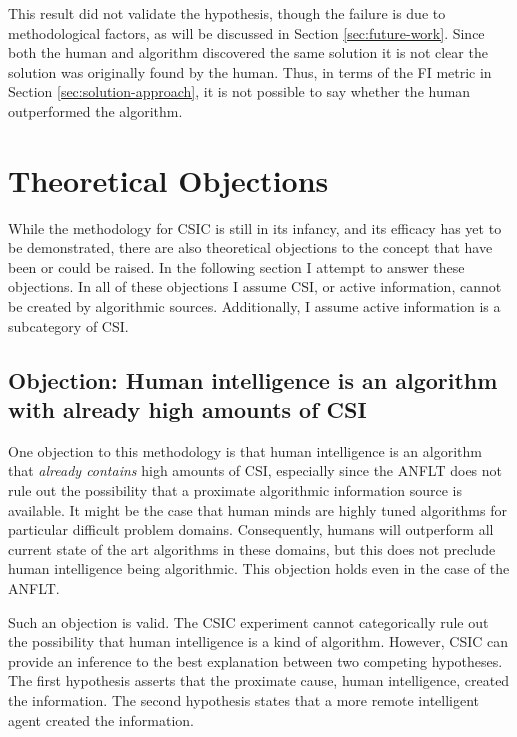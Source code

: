 This result did not validate the hypothesis, though the failure is  due to methodological factors, as will be discussed in Section \ref{sec:future-work}.  Since both the human and algorithm discovered the same solution it is not clear the solution was originally found by the human.  Thus, in terms of the FI metric in Section \ref{sec:solution-approach}, it is not possible to say whether the human outperformed the algorithm.

\section{Theoretical Objections}\label{sec:objections}

While the methodology for CSIC is still in its infancy, and its efficacy has yet to be demonstrated, there are also theoretical objections to the concept that have been or could be raised.  In the following section I attempt to answer these objections.  In all of these objections I assume CSI, or active information, cannot be created by algorithmic sources.  Additionally, I assume active information is a subcategory of CSI.

\subsection{Objection: Human intelligence is an algorithm with already high amounts of CSI}

One objection to this methodology is that human intelligence is an algorithm that \emph{already contains} high amounts of CSI, especially since the ANFLT does not rule out the possibility that a proximate algorithmic information source is available.  It might be the case that human minds are highly tuned algorithms for particular difficult problem domains.  Consequently, humans will outperform all current state of the art algorithms in these domains, but this does not preclude human intelligence being algorithmic.  This objection holds even in the case of the ANFLT.

Such an objection is valid.  The CSIC experiment cannot categorically rule out the possibility that human intelligence is a kind of algorithm.  However, CSIC can provide an inference to the best explanation between two competing hypotheses.  The first hypothesis asserts that the proximate cause, human intelligence, created the information.  The second hypothesis states that a more remote intelligent agent created the information.

